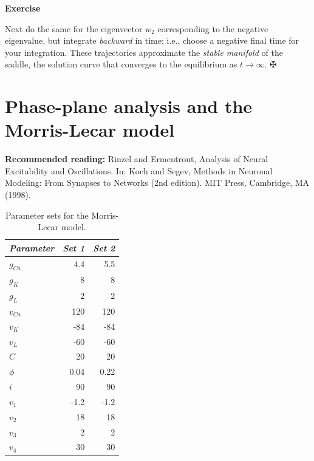 \documentclass [11pt]{article}
\newcounter{exercise}
\numberwithin{exercise}{section}
\newcommand{\exnumber}{\addtocounter{exercise}{1} \theexercise \thinspace}
\begin{document}
{\bf Exercise \exnumber} Next do the same for the eigenvector $w_2$ corresponding to the
negative eigenvalue, but integrate \textit{backward} in time; i.e.,
choose a negative final time for your integration. These trajectories
approximate the {\it stable manifold} of the saddle, the solution curve that converges to the
equilibrium as $t \to \infty$. $\maltese$

\section{Phase-plane analysis and the Morris-Lecar model} \label{MLplane}

\textbf{Recommended reading:} Rinzel and Ermentrout, 
Analysis of Neural Excitability and Oscillations. In: Koch and Segev, Methods in Neuronal 
Modeling: From Synapses to Networks (2nd edition). MIT Press, Cambridge, MA (1998). 

\begin{table}[tbp]
\begin{center}
\begin{tabular}{||l|r|r||}
\hline
{\it Parameter} & {\it Set 1} & {\it Set 2} \\
\hline \hline
$g_{Ca}$ & 4.4 & 5.5\\ \hline
$g_K$ & 8 & 8 \\ \hline
$g_L$ & 2 & 2 \\ \hline
$v_{Ca}$ & 120 & 120 \\ \hline
$v_K$ & -84 & -84 \\ \hline
$v_L$ & -60 & -60 \\ \hline
$C$ & 20 & 20 \\ \hline
$\phi$ & 0.04 & 0.22 \\ \hline
$i$ & 90 & 90 \\ \hline
$v_1$ & -1.2 & -1.2 \\ \hline
$v_2$ & 18 &  18 \\ \hline
$v_3$ & 2 & 2 \\ \hline
$v_4$ & 30 & 30 \\ \hline
\end{tabular}
\end{center}
\caption{\small{Parameter sets for the Morris-Lecar model.}}
\label{ml_table}
\end{table}
\end{document}
